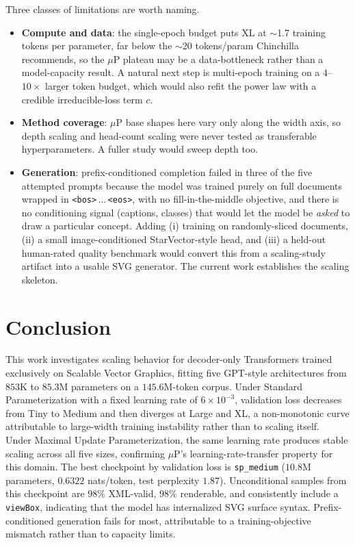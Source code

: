 \documentclass[a4paper]{article}
\begin{document}
Three classes of limitations are worth naming. 
\begin{itemize}
    \item \textbf{Compute and data}: the single-epoch budget puts XL at $\sim$1.7 training tokens per parameter, far below the $\sim$20 tokens/param Chinchilla recommends, so the $\mu$P plateau may be a data-bottleneck rather than a model-capacity result. A natural next step is multi-epoch training on a $4$--$10\times$ larger token budget, which would also refit the power law with a credible irreducible-loss term $c$.
    \item \textbf{Method coverage}: $\mu$P base shapes here vary only along the width axis, so depth scaling and head-count scaling were never tested as transferable hyperparameters. A fuller study would sweep depth too. 
    \item \textbf{Generation}: prefix-conditioned completion failed in three of the five attempted prompts because the model was trained purely on full documents wrapped in \texttt{<bos>}\,$\dots$\,\texttt{<eos>}, with no fill-in-the-middle objective, and there is no conditioning signal (captions, classes) that would let the model be \emph{asked} to draw a particular concept. Adding (i) training on randomly-sliced documents, (ii) a small image-conditioned StarVector-style head, and (iii) a held-out human-rated quality benchmark would convert this from a scaling-study artifact into a usable SVG generator. The current work establishes the scaling skeleton.
\end{itemize}


\section{Conclusion}
This work investigates scaling behavior for decoder-only Transformers trained exclusively on Scalable Vector Graphics, fitting five GPT-style architectures from $853$K to $85.3$M parameters on a $145.6$M-token corpus. Under Standard Parameterization with a fixed learning rate of $6{\times}10^{-3}$, validation loss decreases from Tiny to Medium and then diverges at Large and XL, a non-monotonic curve attributable to large-width training instability rather than to scaling itself. 
\\

Under Maximal Update Parameterization, the same learning rate produces stable scaling across all five sizes, confirming $\mu$P's learning-rate-transfer property for this domain. The best checkpoint by validation loss is \texttt{sp\_medium} ($10.8$M parameters, $0.6322$ nats/token, test perplexity $1.87$). Unconditional samples from this checkpoint are $98\%$ XML-valid, $98\%$ renderable, and consistently include a \texttt{viewBox}, indicating that the model has internalized SVG surface syntax. Prefix-conditioned generation fails for most, attributable to a training-objective mismatch rather than to capacity limits. 
\\
\end{document}

